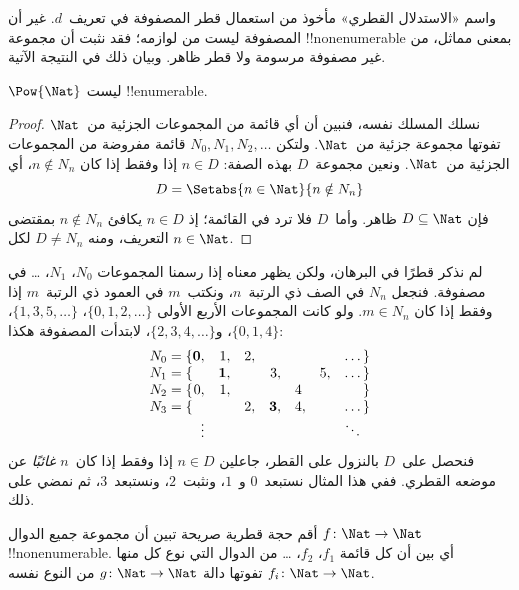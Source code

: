 \documentclass[../../../include/open-logic-section]{subfiles}
\begin{document}
\begin{explain}
واسم «الاستدلال القطري» مأخوذ من استعمال قطر المصفوفة في تعريف~$d$. غير أن المصفوفة ليست من لوازمه؛ فقد نثبت أن مجموعة !!{nonenumerable} بمعنى مماثل، من غير مصفوفة مرسومة ولا قطر ظاهر. وبيان ذلك في النتيجة الآتية.
\end{explain}

\begin{thm}
$\Pow{\Nat}$ ليست !!{enumerable}.
\end{thm}

\begin{proof}
نسلك المسلك نفسه، فنبين أن أي قائمة من المجموعات الجزئية من~$\Nat$ تفوتها مجموعة جزئية من~$\Nat$. ولتكن $N_0, N_1, N_2, \ldots$ قائمة مفروضة من المجموعات الجزئية من~$\Nat$. ونعين مجموعة~$D$ بهذه الصفة: $n \in D$ إذا وفقط إذا كان $n \notin
N_{n}$، أي
\[
D = \Setabs{n \in \Nat}{n \notin N_n}
\]
فإن $D\subseteq \Nat$ ظاهر. وأما~$D$ فلا ترد في القائمة؛ إذ $n \in D$ يكافئ $n\notin N_n$ بمقتضى التعريف، ومنه $D \neq N_n$ لكل $n \in \Nat$.
\end{proof}

\begin{explain}
لم نذكر قطرًا في البرهان، ولكن يظهر معناه إذا رسمنا المجموعات $N_0$، $N_1$، \dots{} في مصفوفة. فنجعل $N_n$ في الصف ذي الرتبة~$n$، ونكتب~$m$ في العمود ذي الرتبة~$m$ إذا وفقط إذا كان $m \in N_n$. ولو كانت المجموعات الأربع الأولى $\{0,1,2,\dots\}$، $\{1, 3, 5, \dots\}$، $\{0,1,4\}$، و$\{2,3,4,\dots\}$، لابتدأت المصفوفة هكذا:
\[
\begin{array}{r@{}rrrrrrr}
  N_0 = \{ & \mathbf{0}, & 1, & 2, & & & & \dots\}\\
  N_1 = \{ &  & \mathbf{1}, &  & 3, &  & 5, & \dots\}\\
  N_2 = \{ & 0, & 1, &  &  & 4\phantom{,} &  & \}\\
  N_3 = \{ &  &  & 2, & \mathbf{3}, & 4, & & \dots\}\\
  &\vdots & & & & & & \ddots\phantom{\}}
  \end{array}
\]
فنحصل على~$D$ بالنزول على القطر، جاعلين $n \in D$ إذا وفقط إذا كان~$n$ \emph{غائبًا} عن موضعه القطري. ففي هذا المثال نستبعد~$0$ و~$1$، ونثبت~$2$، ونستبعد~$3$، ثم نمضي على ذلك.
\end{explain}

\begin{prob}
أقم حجة قطرية صريحة تبين أن مجموعة جميع الدوال $f \colon \Nat \to
\Nat$ !!{nonenumerable}. أي بين أن كل قائمة $f_1$، $f_2$، \dots{} من الدوال التي نوع كل منها $f_i\colon \Nat \to \Nat$ تفوتها دالة $g \colon \Nat \to \Nat$ من النوع نفسه.
\end{prob}
\end{document}
